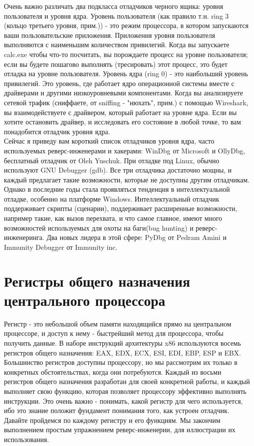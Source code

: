 \documentclass[12pt, a4paper, oneside]{book}
\begin{document}
Очень важно различать два подкласса отладчиков черного ящика: уровня пользователя и уровня ядра. Уровень пользователя (как правило т.н. ring 3 (кольцо третьего уровня, прим.)) - это режим процессора, в котором запускаются ваши пользовательские приложения. Приложения уровня пользователя выполняются с наименьшим количеством привилегий. Когда вы запускаете calc.exe чтобы что-то посчитать, вы порождаете процесс на уровне пользователя; если вы будете пошагово выполнять (тресировать) этот процесс, это будет отладка на уровне пользователя. Уровень ядра (ring 0) - это наибольший уровень привилегий. Это уровень, где работает ядро операционной системы вместе с драйверами и другими низкоуровневыми компонентами. Когда вы анализируете сетевой трафик (сниффаете, от sniffing - "нюхать", прим.) с помощью Wireshark, вы взаимодействуете с драйвером, который работает на уровне ядра. Если вы хотите остановить драйвер, и исследовать его состояние в любой точке, то вам понадобится отладчик уровня ядра.\\

Сейчас я приведу вам короткий список отладчиков уровня ядра, часто используемых реверс-инженерами и хакерами: WinDbg от Microsoft и OllyDbg, бесплатный отладчик от Oleh Yuschuk. При отладке под Linux, обычно используют GNU Debugger (gdb). Все три отладчика достаточно мощны, и каждый предлагает такие возможности, которые не доступны другим отладчикам.\\

Однако в последние годы стала проявляться тенденция в интеллектуальной отладке, особенно на платформе Windows. Интеллектуальный отладчик поддерживает скрипты (сценарии), поддерживает расширенные возможности, например такие, как вызов перехвата, и что самое главное, имеют много возможностей используемых для охоты на баги(bug hunting) и реверс-инженеринга. Два новых лидера в этой сфере: PyDbg от Pedram Amini и Immunity Debugger от Immunity inc.\\


\section{Регистры общего назначения центрального процессора}

Регистр - это небольшой объем памяти находящийся прямо на центральном процессоре, и доступ к нему - быстрейший метод для процессора, чтобы получить данные. В наборе инструкций архитектуры x86 используются восемь регистров общего назначения: EAX, EDX, ECX, ESI, EDI, EBP, ESP и EBX. Большинство регистров доступны процессору, но мы рассмотрим их только в конкретных обстоятельствах, когда они потребуются. Каждый из восьми регистров общего назначения разработан для своей конкретной работы, и каждый выполняет свою функцию, которая позволяет процессору эффективно выполнять инструкции. Это очень важно - понимать, какой регистр для чего используется, ибо это знание положит фундамент понимания того, как устроен отладчик. Давайте пройдемся по каждому регистру и его функциям. Мы закончим выполнением простым упражнением реверс-инженерии, для иллюстрации их использования.\\
\end{document}
